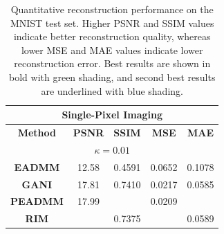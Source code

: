 \documentclass[conference]{IEEEtran}
\begin{document}
\begin{table}[b!]
\caption{Quantitative reconstruction performance on the MNIST test set. Higher PSNR and SSIM values indicate better reconstruction quality, whereas lower MSE and MAE values indicate lower reconstruction error. Best results are shown in bold with green shading, and second best results are underlined with blue shading.}
\label{tab:reconstruction_metrics}
\setlength{\tabcolsep}{12pt}
\renewcommand{\arraystretch}{1.3}
\begin{tabular}{|ccccc|}
\hline \hline
\multicolumn{5}{|c|}{\textbf{Single-Pixel Imaging}}                                                                                                                                                                                                                         \\ \hline
\multicolumn{1}{|c|}{\textbf{Method}}                         & \multicolumn{1}{c|}{\textbf{PSNR}}                          & \multicolumn{1}{c|}{\textbf{SSIM}}                           & \multicolumn{1}{c|}{\textbf{MSE}}                            & \textbf{MAE}    \\ \hline
\multicolumn{5}{|c|}{\textbf{$\kappa = 0.01$}}                                                                                                                                                                                                                              \\ \hline
\multicolumn{1}{|c|}{\textbf{EADMM}}                          & \multicolumn{1}{c|}{12.58}                                  & \multicolumn{1}{c|}{0.4591}                                  & \multicolumn{1}{c|}{0.0652}                                  & 0.1078          \\ \hline
\multicolumn{1}{|c|}{\textbf{GANI}}                           & \multicolumn{1}{c|}{17.81}                                  & \multicolumn{1}{c|}{0.7410}                                  & \multicolumn{1}{c|}{0.0217}                                  & 0.0585          \\ \hline
\multicolumn{1}{|c|}{\textbf{PEADMM}} & \multicolumn{1}{c|}{17.99}          & \multicolumn{1}{c|}{\cellcolor[HTML]{DDEBF7}{\ul 0.7466}}          & \multicolumn{1}{c|}{0.0209}          & \cellcolor[HTML]{DDEBF7}{\ul 0.0577}    \\ \hline
\multicolumn{1}{|c|}{\textbf{RIM}}    & \multicolumn{1}{c|}{\cellcolor[HTML]{DDEBF7}{\ul 18.29}}    & \multicolumn{1}{c|}{0.7375}    & \multicolumn{1}{c|}{\cellcolor[HTML]{DDEBF7}{\ul 0.0197}}    & 0.0589          \\ \hline

\end{tabular}
\end{table}
\end{document}
